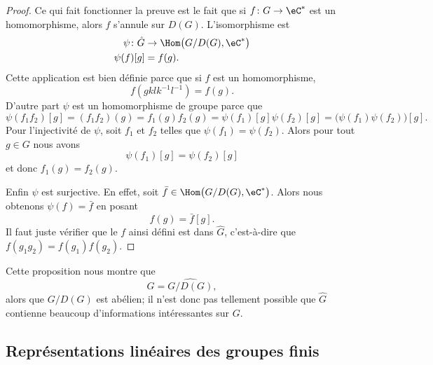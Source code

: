 \begin{proof}
    Ce qui fait fonctionner la preuve est le fait que si \( f\colon G\to \eC^*\) est un homomorphisme, alors \( f\) s'annule sur \( D(G)\). L'isomorphisme est
    \begin{equation}
        \begin{aligned}
            \psi\colon \hat G&\to \Hom\big( G/D(G),\eC^* \big) \\
            \psi(f)[g]&=f(g).
        \end{aligned}
    \end{equation}
    Cette application est bien définie parce que si \( f\) est un homomorphisme,
    \begin{equation}
        f(gklk^{-1}l^{-1})=f(g).
    \end{equation}
    D'autre part \( \psi\) est un homomorphisme de groupe parce que
    \begin{equation}
        \psi(f_1f_2)[g]=(f_1f_2)(g)=f_1(g)f_2(g)=\psi(f_1)[g]\psi(f_2)[g]=\big( \psi(f_1)\psi(f_2) \big)[g].
    \end{equation}
    Pour l'injectivité de \( \psi\), soit \( f_1\) et \( f_2\) telles que \( \psi(f_1)=\psi(f_2)\). Alors pour tout \( g\in G\) nous avons
    \begin{equation}
        \psi(f_1)[g]=\psi(f_2)[g]
    \end{equation}
    et donc \( f_1(g)=f_2(g)\).

    Enfin \( \psi\) est surjective. En effet, soit \( \bar f\in\Hom\big( G/D(G),\eC^* \big)\). Alors nous obtenons \( \psi(f)=\bar f\) en posant
    \begin{equation}
        f(g)=\bar f[g].
    \end{equation}
    Il faut juste vérifier que le \( f\) ainsi défini est dans \( \hat G\), c'est-à-dire que \( f(g_1g_2)=f(g_1)f(g_2)\).
\end{proof}

Cette proposition nous montre que
\begin{equation}
    \hat G=\widehat{G/D(G)},
\end{equation}
alors que \( G/D(G)\) est abélien; il n'est donc pas tellement possible que \( \hat G\) contienne beaucoup d'informations intéressantes sur \( G\).

\subsection{Représentations linéaires des groupes finis}

